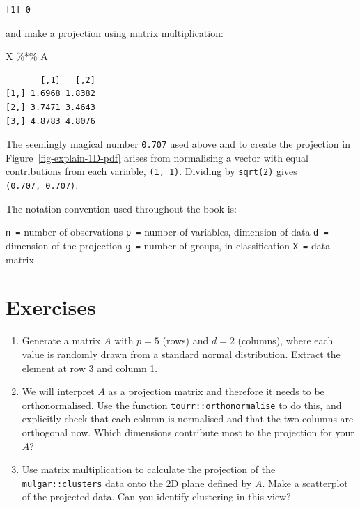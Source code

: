 \documentclass[
  letterpaper,
]{krantz}
\newenvironment{Shaded}{\begin{snugshade}}{\end{snugshade}}
\newcommand{\NormalTok}[1]{\textcolor[rgb]{0.00,0.23,0.31}{#1}}
\newcommand{\SpecialCharTok}[1]{\textcolor[rgb]{0.37,0.37,0.37}{#1}}
\providecommand{\tightlist}{%
  \setlength{\itemsep}{0pt}\setlength{\parskip}{0pt}}\usepackage{longtable,booktabs,array}
\begin{document}
\begin{verbatim}
[1] 0
\end{verbatim}

and make a projection using matrix multiplication:

\begin{Shaded}
\begin{Highlighting}[]
\NormalTok{X }\SpecialCharTok{\%*\%}\NormalTok{ A}
\end{Highlighting}
\end{Shaded}

\begin{verbatim}
       [,1]   [,2]
[1,] 1.6968 1.8382
[2,] 3.7471 3.4643
[3,] 4.8783 4.8076
\end{verbatim}

The seemingly magical number \texttt{0.707} used above and to create the
projection in Figure~\ref{fig-explain-1D-pdf} arises from normalising a
vector with equal contributions from each variable, \texttt{(1,\ 1)}.
Dividing by \texttt{sqrt(2)} gives \texttt{(0.707,\ 0.707)}.

The notation convention used throughout the book is:

\texttt{n\ =} number of observations \texttt{p\ =} number of variables,
dimension of data \texttt{d\ =} dimension of the projection
\texttt{g\ =} number of groups, in classification \texttt{X\ =} data
matrix

\section*{Exercises}\label{exercises-1}


\begin{enumerate}
\def\labelenumi{\arabic{enumi}.}
\tightlist
\item
  Generate a matrix \(A\) with \(p=5\) (rows) and \(d=2\) (columns),
  where each value is randomly drawn from a standard normal
  distribution. Extract the element at row 3 and column 1.
\item
  We will interpret \(A\) as a projection matrix and therefore it needs
  to be orthonormalised. Use the function \texttt{tourr::orthonormalise}
  to do this, and explicitly check that each column is normalised and
  that the two columns are orthogonal now. Which dimensions contribute
  most to the projection for your \(A\)?
\item
  Use matrix multiplication to calculate the projection of the
  \texttt{mulgar::clusters} data onto the 2D plane defined by \(A\).
  Make a scatterplot of the projected data. Can you identify clustering
  in this view?
\end{enumerate}
\end{document}
